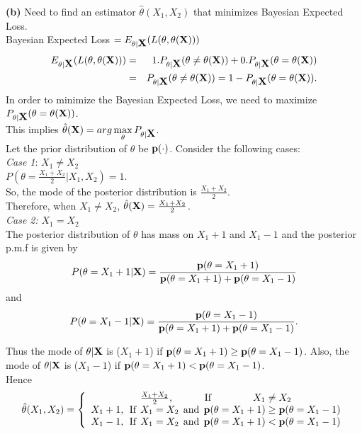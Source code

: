 \textbf{(b)} Need to find an estimator $\hat{\theta}(X_1,X_2)$ that minimizes Bayesian Expected Loss. \\

Bayesian Expected Loss $=E_{\theta|\hbox{\bf X}}(L(\theta,\theta(\hbox{\bf X})))$
\begin{eqnarray}
E_{\theta|\hbox{\bf X}}(L(\theta,\theta(\hbox{\bf X}))) &=& 1. P_{\theta|\hbox{\bf X}}(\theta\neq \theta(\hbox{\bf X}))+0. P_{\theta|\hbox{\bf X}}(\theta=\theta(\hbox{\bf X}))\nonumber\\
&=& P_{\theta|\hbox{\bf X}}(\theta\neq \theta(\hbox{\bf X}))=1-P_{\theta|\hbox{\bf X}}(\theta=\theta(\hbox{\bf X}))\nonumber.
\end{eqnarray}
In order to minimize the Bayesian Expected Loss, we need to maximize \\
$P_{\theta|\hbox{\bf X}}(\theta=\theta(\hbox{\bf X}))$. \\
This implies
$\hat{\theta}(\hbox{\bf X})=arg\max\limits_{\theta} P_{\theta|\hbox{\bf X}}$. \\

Let the prior distribution of $\theta$ be $\hbox{\bf p}(\cdot)$. 
Consider the following cases:\\

\emph{Case 1}: $X_1\neq X_2$ \\

$P(\theta=\frac{X_1+X_2}{2}|X_1,X_2)=1$. \\So, the mode of the posterior distribution is $\frac{X_1+X_2}{2}$. \\Therefore, when $X_1\neq X_2$, $\hat{\theta}(\hbox{\bf X})={{X_1+X_2}\over{2}}$. \\

\emph{Case 2:} $X_1=X_2$\\

The posterior distribution of $\theta$ has mass on $X_1+1$ and $X_1-1$ and the posterior p.m.f is given by
\begin{equation}
P(\theta=X_1+1|\hbox{\bf X})={{\hbox{\bf p}(\theta=X_1+1)}\over{\hbox{\bf p}(\theta=X_1+1)+\hbox{\bf p}(\theta=X_1-1)}}\nonumber
\end{equation}
and 
\begin{equation}
P(\theta=X_1-1|\hbox{\bf X})={{\hbox{\bf p}(\theta=X_1-1)}\over{\hbox{\bf p}(\theta=X_1+1)+\hbox{\bf p}(\theta=X_1-1)}}.\nonumber
\end{equation}


Thus the mode of $\theta|\hbox{\bf X}$ is ($X_1+1$) if $\hbox{\bf p}(\theta=X_1+1)\geq \hbox{\bf p}(\theta=X_1-1)$. Also, the mode of $\theta|\hbox{\bf X}$ is ($X_1-1$) if $\hbox{\bf p}(\theta=X_1+1) < \hbox{\bf p}(\theta=X_1-1)$. \\
Hence
$$
\hat{\theta}(X_1,X_2)=\left\{\begin{array}{c}
{{X_1+X_2}\over{2}}, \:\:\:\:\:\:\:\:\:\:\:\:\:\:\mbox{If}\:\:\:\:\:\:\:\:\:\:\:\:\:\:\:\:\:\:\:X_1\neq X_2\\
X_1+1,\:\:\mbox{If}\:\:X_1=X_2\:\:\mbox{and}\:\:\hbox{\bf p}(\theta=X_1+1)\geq \hbox{\bf p}(\theta=X_1-1)\\
X_1-1,\:\:\mbox{If}\:\:X_1=X_2\:\:\mbox{and}\:\:\hbox{\bf p}(\theta=X_1+1)<\hbox{\bf p}(\theta=X_1-1)\\
\end{array}
\right.
$$
